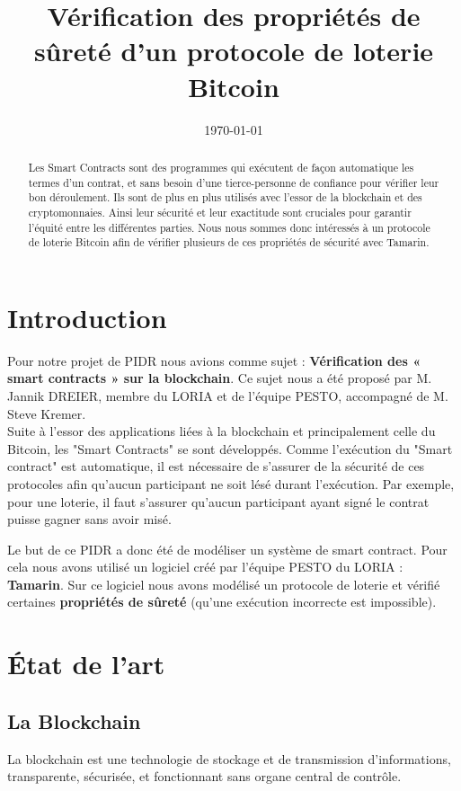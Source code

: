 \documentclass[conference]{IEEEtran}
\title{Vérification des propriétés de sûreté d'un protocole de loterie Bitcoin}
\author{\IEEEauthorblockN{Guillaume Stunault}
\IEEEauthorblockA{Etudiant \\ Telecom Nancy}
\and \IEEEauthorblockN{Lucas Vignali} 
\IEEEauthorblockA{Etudiant \\ Telecom Nancy} }
\date{\today}
\begin{document}
\maketitle
\begin{abstract}
Les Smart Contracts sont des programmes qui exécutent de façon automatique les termes d'un contrat, et sans besoin d'une tierce-personne de confiance pour vérifier leur bon déroulement\cite{ethercontract}.
Ils sont de plus en plus utilisés avec l'essor de la blockchain et des cryptomonnaies. Ainsi leur sécurité et leur exactitude sont cruciales pour garantir l'équité entre les différentes parties\cite{bcfr-smart, smartdeloitte}.
Nous nous sommes donc intéressés à un protocole de loterie Bitcoin \cite{955} afin de vérifier plusieurs de ces propriétés de sécurité avec Tamarin\cite{tamarin}.
\end{abstract}
\section{Introduction}

Pour notre projet de PIDR nous avions comme sujet : \textbf{Vérification des « smart contracts » sur la blockchain}. Ce sujet nous a été proposé par M. Jannik DREIER, membre du LORIA et de l'équipe PESTO, accompagné de M. Steve Kremer. \\Suite à l'essor des applications liées à la blockchain et principalement celle du Bitcoin, les "Smart Contracts" se sont développés. Comme l'exécution du "Smart contract" est automatique, il est nécessaire de s'assurer de la sécurité de ces protocoles afin qu'aucun participant ne soit lésé durant l'exécution. Par exemple, pour une loterie, il faut s'assurer qu'aucun participant ayant signé le contrat puisse gagner sans avoir misé.

Le but de ce PIDR a donc été de modéliser un système de smart contract. Pour cela nous avons utilisé un logiciel créé par l'équipe PESTO du LORIA : \textbf{Tamarin}\cite{tamarin}. Sur ce logiciel nous avons modélisé un protocole de loterie et vérifié certaines \textbf{propriétés de sûreté} (qu'une exécution incorrecte est impossible).
\newpage
\section{État de l'art}
\subsection{La Blockchain}
La blockchain est une technologie de stockage et de transmission d’informations, transparente, sécurisée, et fonctionnant sans organe central de contrôle.
\end{document}
